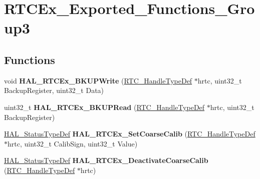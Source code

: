 \hypertarget{group___r_t_c_ex___exported___functions___group3}{}\section{R\+T\+C\+Ex\+\_\+\+Exported\+\_\+\+Functions\+\_\+\+Group3}
\label{group___r_t_c_ex___exported___functions___group3}
\subsection*{Functions}
\begin{DoxyCompactItemize}
\item 
\mbox{\label{group___r_t_c_ex___exported___functions___group3_gafb908a2f254ccff959c31ac70e957de4}} 
void {\bfseries H\+A\+L\+\_\+\+R\+T\+C\+Ex\+\_\+\+B\+K\+U\+P\+Write} (\hyperlink{struct_r_t_c___handle_type_def}{R\+T\+C\+\_\+\+Handle\+Type\+Def} $\ast$hrtc, uint32\+\_\+t Backup\+Register, uint32\+\_\+t Data)
\item 
\mbox{\label{group___r_t_c_ex___exported___functions___group3_ga37ba612da141a2b443bf64210f981513}} 
uint32\+\_\+t {\bfseries H\+A\+L\+\_\+\+R\+T\+C\+Ex\+\_\+\+B\+K\+U\+P\+Read} (\hyperlink{struct_r_t_c___handle_type_def}{R\+T\+C\+\_\+\+Handle\+Type\+Def} $\ast$hrtc, uint32\+\_\+t Backup\+Register)
\item 
\mbox{\label{group___r_t_c_ex___exported___functions___group3_ga0f77700814ccfaa7a10969012ad92968}} 
\hyperlink{stm32f4xx__hal__def_8h_a63c0679d1cb8b8c684fbb0632743478f}{H\+A\+L\+\_\+\+Status\+Type\+Def} {\bfseries H\+A\+L\+\_\+\+R\+T\+C\+Ex\+\_\+\+Set\+Coarse\+Calib} (\hyperlink{struct_r_t_c___handle_type_def}{R\+T\+C\+\_\+\+Handle\+Type\+Def} $\ast$hrtc, uint32\+\_\+t Calib\+Sign, uint32\+\_\+t Value)
\item 
\mbox{\label{group___r_t_c_ex___exported___functions___group3_ga7803f69ddb68e220dd2b263e523bcdce}} 
\hyperlink{stm32f4xx__hal__def_8h_a63c0679d1cb8b8c684fbb0632743478f}{H\+A\+L\+\_\+\+Status\+Type\+Def} {\bfseries H\+A\+L\+\_\+\+R\+T\+C\+Ex\+\_\+\+Deactivate\+Coarse\+Calib} (\hyperlink{struct_r_t_c___handle_type_def}{R\+T\+C\+\_\+\+Handle\+Type\+Def} $\ast$hrtc)

\end{DoxyCompactItemize}

